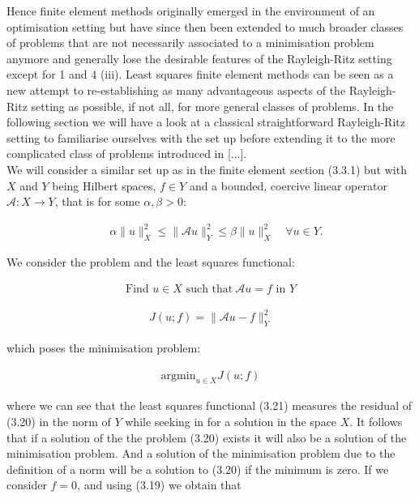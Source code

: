 \documentclass[../draft_1.tex]{subfiles}
\begin{document}
Hence finite element methods originally emerged in the environment of an optimisation setting but have since then been extended to much broader classes of problems that are not necessarily associated to a minimisation problem anymore and generally lose the desirable features of the Rayleigh-Ritz setting except for 1 and 4 (iii). Least squares finite element methods can be seen as a new attempt to re-establishing as many advantageous aspects of the Rayleigh-Ritz setting as possible, if not all, for more general classes of problems. In the following section we will have a look at a classical straightforward Rayleigh-Ritz setting to familiarise ourselves with the set up before extending it to the more complicated class of problems introduced in [...]. 
\smallskip
\\
We will consider a similar set up as in the finite element section (3.3.1) but with $X$ and $Y$ being Hilbert spaces, $f \in Y$ and a bounded, coercive linear operator $\mathcal{A}: X \rightarrow Y$, that is for some  $\alpha, \beta > 0$:
\begin{ceqn}
\begin{align}
\quad \alpha \| u \|_X^2 \leq \| \mathcal{A} u \|_Y^2 \leq \beta \| u \|_X^2 \quad \forall u \in Y.
\end{align} 
\end{ceqn}
We consider the problem and the least squares functional:
\begin{ceqn}
\begin{align}
 \text{Find } u \in X  \text{ such that} \ \mathcal{A} u = f \text{ in } Y	
\end{align}

\begin{align}
J(u; f) = \| \mathcal{A} u - f \|_Y^2
\end{align}
\end{ceqn}
which poses the minimisation problem:
 \begin{ceqn}
\begin{align}
\text{argmin}_{u \in X} J(u; f)
\end{align}
\end{ceqn}
where we can see that the least squares functional (3.21) measures the residual of (3.20) in the norm of $Y$ while seeking in for a solution in the space $X$. It follows that if a solution of the the problem (3.20) exists it will also be a solution of the minimisation problem. And a solution of the minimisation problem due to the definition of a norm will be a solution to (3.20) if the minimum is zero. If we consider $f = 0$, and using (3.19) we obtain that 
\end{document}
